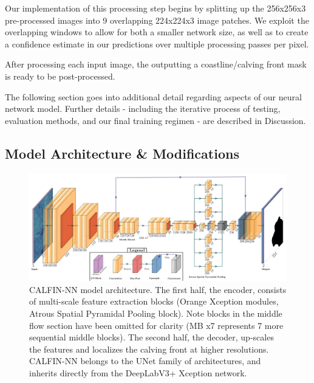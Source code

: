 \documentclass[tc, manuscript]{copernicus}
\begin{document}
Our implementation of this processing step begins by splitting up the 256x256x3 pre-processed images into 9 overlapping 224x224x3 image patches. We exploit the overlapping windows to allow for both a smaller network size, as well as  to create a confidence estimate in our predictions over multiple processing passes per pixel.

After processing each input image, the  outputting a coastline/calving front mask is ready to be post-processed.

The following section goes into additional detail regarding aspects of our neural network model. Further details - including the iterative process of testing, evaluation methods, and our final training regimen - are described in Discussion. 

\subsection{Model Architecture \& Modifications}

\begin{figure}[t]
\includegraphics[width=18cm]{arch_final.png}
\centering
\caption{CALFIN-NN model architecture. The first half, the encoder, consists of multi-scale feature extraction blocks (Orange Xception modules, Atrous Spatial Pyramidal Pooling block). Note blocks in the middle flow section have been omitted for clarity (MB x7 represents 7 more sequential middle blocks). The second half, the decoder, up-scales the features and localizes the calving front at higher resolutions. CALFIN-NN belongs to the UNet family of architectures, and inherits directly from the DeepLabV3+ Xception network.}
\end{figure}
\end{document}
